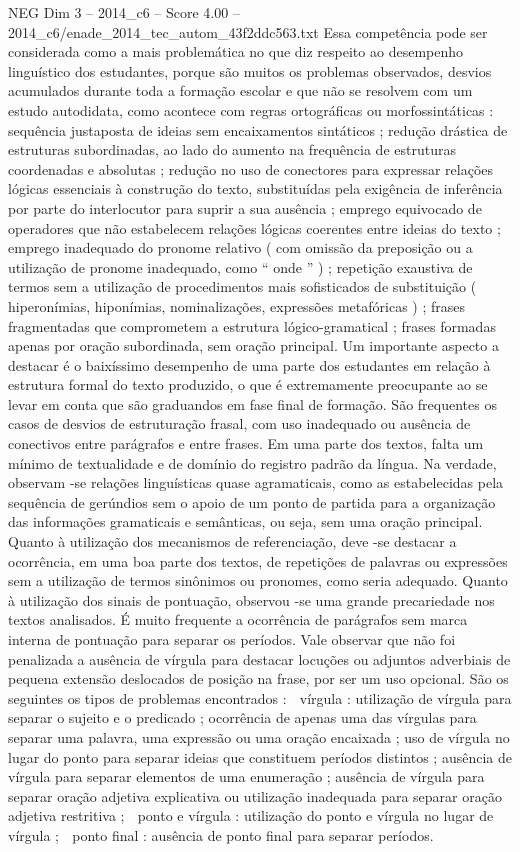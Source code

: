 \begin{textsample}{NEG Dim 3 – 2014\_c6 – Score 4.00 – 2014\_c6/enade\_2014\_tec\_autom\_43f2ddc563.txt}
Essa competência pode ser considerada como a mais problemática no que diz respeito ao desempenho linguístico dos estudantes, porque são muitos os problemas observados, desvios acumulados durante toda a formação escolar e que não se resolvem com um estudo autodidata, como acontece com regras ortográficas ou morfossintáticas : sequência justaposta de ideias sem encaixamentos sintáticos ; redução drástica de estruturas subordinadas, ao lado do aumento na frequência de estruturas coordenadas e absolutas ; redução no uso de conectores para expressar relações lógicas essenciais à construção do texto, substituídas pela exigência de inferência por parte do interlocutor para suprir a sua ausência ; emprego equivocado de operadores que não estabelecem relações lógicas coerentes entre ideias do texto ; emprego inadequado do pronome relativo ( com omissão da preposição ou a utilização de pronome inadequado, como “ onde ” ) ; repetição exaustiva de termos sem a utilização de procedimentos mais sofisticados de substituição ( hiperonímias, hiponímias, nominalizações, expressões metafóricas ) ; frases fragmentadas que comprometem a estrutura lógico-gramatical ; frases formadas apenas por oração subordinada, sem oração principal.
Um importante aspecto a destacar é o baixíssimo desempenho de uma parte dos estudantes em relação à estrutura formal do texto produzido, o que é extremamente preocupante ao se levar em conta que são graduandos em fase final de formação.
São frequentes os casos de desvios de estruturação frasal, com uso inadequado ou ausência de conectivos entre parágrafos e entre frases.
Em uma parte dos textos, falta um mínimo de textualidade e de domínio do registro padrão da língua.
Na verdade, observam -se relações linguísticas quase agramaticais, como as estabelecidas pela sequência de gerúndios sem o apoio de um ponto de partida para a organização das informações gramaticais e semânticas, ou seja, sem uma oração principal.
Quanto à utilização dos mecanismos de referenciação, deve -se destacar a ocorrência, em uma boa parte dos textos, de repetições de palavras ou expressões sem a utilização de termos sinônimos ou pronomes, como seria adequado.
Quanto à utilização dos sinais de pontuação, observou -se uma grande precariedade nos textos analisados.
É muito frequente a ocorrência de parágrafos sem marca interna de pontuação para separar os períodos.
Vale observar que não foi penalizada a ausência de vírgula para destacar locuções ou adjuntos adverbiais de pequena extensão deslocados de posição na frase, por ser um uso opcional.
São os seguintes os tipos de problemas encontrados :  vírgula : utilização de vírgula para separar o sujeito e o predicado ; ocorrência de apenas uma das vírgulas para separar uma palavra, uma expressão ou uma oração encaixada ; uso de vírgula no lugar do ponto para separar ideias que constituem períodos distintos ; ausência de vírgula para separar elementos de uma enumeração ; ausência de vírgula para separar oração adjetiva explicativa ou utilização inadequada para separar oração adjetiva restritiva ;  ponto e vírgula : utilização do ponto e vírgula no lugar de vírgula ;  ponto final : ausência de ponto final para separar períodos.

\end{textsample}
